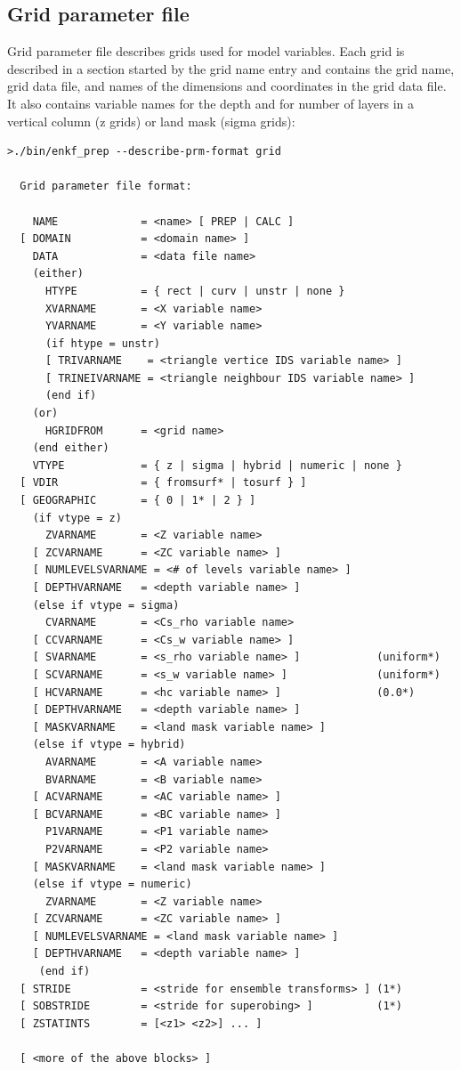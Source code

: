 \documentclass[11pt]{report}
\begin{document}
\subsection{Grid parameter file}
\label{sec:gridprm}

Grid parameter file describes grids used for model variables.
Each grid is described in a section started by the grid name entry and contains the grid name, grid data file, and names of the dimensions and coordinates in the grid data file.
It also contains variable names for the depth and for number of layers in a vertical column (z grids) or land mask (sigma grids):
\begin{Verbatim}[frame=single,fontsize=\footnotesize]
>./bin/enkf_prep --describe-prm-format grid

  Grid parameter file format:

    NAME             = <name> [ PREP | CALC ]
  [ DOMAIN           = <domain name> ]
    DATA             = <data file name>
    (either)
      HTYPE          = { rect | curv | unstr | none }
      XVARNAME       = <X variable name>
      YVARNAME       = <Y variable name>
      (if htype = unstr)
      [ TRIVARNAME    = <triangle vertice IDS variable name> ]
      [ TRINEIVARNAME = <triangle neighbour IDS variable name> ]
      (end if)
    (or)
      HGRIDFROM      = <grid name>
    (end either)
    VTYPE            = { z | sigma | hybrid | numeric | none }
  [ VDIR             = { fromsurf* | tosurf } ]
  [ GEOGRAPHIC       = { 0 | 1* | 2 } ]
    (if vtype = z)
      ZVARNAME       = <Z variable name>
    [ ZCVARNAME      = <ZC variable name> ]
    [ NUMLEVELSVARNAME = <# of levels variable name> ]
    [ DEPTHVARNAME   = <depth variable name> ]
    (else if vtype = sigma)
      CVARNAME       = <Cs_rho variable name>
    [ CCVARNAME      = <Cs_w variable name> ]
    [ SVARNAME       = <s_rho variable name> ]            (uniform*)
    [ SCVARNAME      = <s_w variable name> ]              (uniform*)
    [ HCVARNAME      = <hc variable name> ]               (0.0*)
    [ DEPTHVARNAME   = <depth variable name> ]
    [ MASKVARNAME    = <land mask variable name> ]
    (else if vtype = hybrid)
      AVARNAME       = <A variable name>
      BVARNAME       = <B variable name>
    [ ACVARNAME      = <AC variable name> ]
    [ BCVARNAME      = <BC variable name> ]
      P1VARNAME      = <P1 variable name>
      P2VARNAME      = <P2 variable name>
    [ MASKVARNAME    = <land mask variable name> ]
    (else if vtype = numeric)
      ZVARNAME       = <Z variable name>
    [ ZCVARNAME      = <ZC variable name> ]
    [ NUMLEVELSVARNAME = <land mask variable name> ]
    [ DEPTHVARNAME   = <depth variable name> ]
     (end if)
  [ STRIDE           = <stride for ensemble transforms> ] (1*)
  [ SOBSTRIDE        = <stride for superobing> ]          (1*)
  [ ZSTATINTS        = [<z1> <z2>] ... ]

  [ <more of the above blocks> ]
\end{Verbatim}
\end{document}
